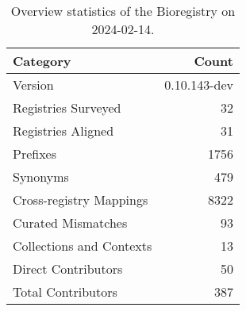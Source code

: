 \begin{table}
\caption{Overview statistics of the Bioregistry on 2024-02-14.}
\label{tab:bioregistry-summary}
\begin{tabular}{lr}
\toprule
Category & Count \\
\midrule
Version & 0.10.143-dev \\
Registries Surveyed & 32 \\
Registries Aligned & 31 \\
Prefixes & 1756 \\
Synonyms & 479 \\
Cross-registry Mappings & 8322 \\
Curated Mismatches & 93 \\
Collections and Contexts & 13 \\
Direct Contributors & 50 \\
Total Contributors & 387 \\
\bottomrule
\end{tabular}
\end{table}
